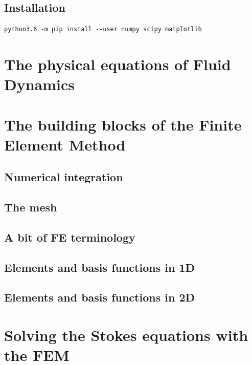 \documentclass[a4paper]{article}
\begin{document}
\subsection{Installation}

\begin{verbatim}
python3.6 -m pip install --user numpy scipy matplotlib
\end{verbatim}

\newpage
\section{The physical equations of Fluid Dynamics}


\newpage
\section{The building blocks of the Finite Element Method}

\subsection{Numerical integration}


\subsection{The mesh}

\subsection{A bit of FE terminology}


\subsection{Elements and basis functions in 1D}



\subsection{Elements and basis functions in 2D}


\newpage
\section{Solving the Stokes equations with the FEM}
\end{document}
